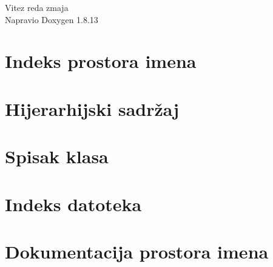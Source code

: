 \documentclass[twoside]{book}
\newcommand{\+}{\discretionary{\mbox{\scriptsize$\hookleftarrow$}}{}{}}
\newcommand{\clearemptydoublepage}{%
  \newpage{\pagestyle{empty}\cleardoublepage}%
}
\begin{document}
\hypersetup{pageanchor=false,
             bookmarksnumbered=true,
             pdfencoding=unicode
            }
\begin{titlepage}
\vspace*{7cm}
\begin{center}%
{\Large Vitez reda zmaja }\\
\vspace*{1cm}
{\large Napravio Doxygen 1.8.13}\\
\end{center}
\end{titlepage}
\clearemptydoublepage
{}
\tableofcontents
\clearemptydoublepage
{}
\hypersetup{pageanchor=true}

\chapter{Indeks prostora imena}

\chapter{Hijerarhijski sadržaj}

\chapter{Spisak klasa}

\chapter{Indeks datoteka}

\chapter{Dokumentacija prostora imena}










\end{document}
